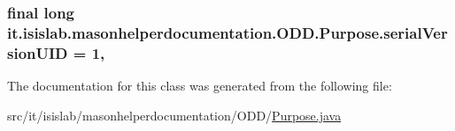 \hypertarget{classit_1_1isislab_1_1masonhelperdocumentation_1_1_o_d_d_1_1_purpose_a87ffe58f2db7565aeb8cb62e2ba7beb6}{
\subsubsection[{serial\-Version\-U\-I\-D}]{\setlength{\rightskip}{0pt plus 5cm}final long it.\-isislab.\-masonhelperdocumentation.\-O\-D\-D.\-Purpose.\-serial\-Version\-U\-I\-D = 1\hspace{0.3cm}{\ttfamily [static]}, {\ttfamily [private]}}}\label{classit_1_1isislab_1_1masonhelperdocumentation_1_1_o_d_d_1_1_purpose_a87ffe58f2db7565aeb8cb62e2ba7beb6}


The documentation for this class was generated from the following file\-:\begin{DoxyCompactItemize}
\item 
src/it/isislab/masonhelperdocumentation/\-O\-D\-D/\hyperlink{_purpose_8java}{Purpose.\-java}\end{DoxyCompactItemize}
